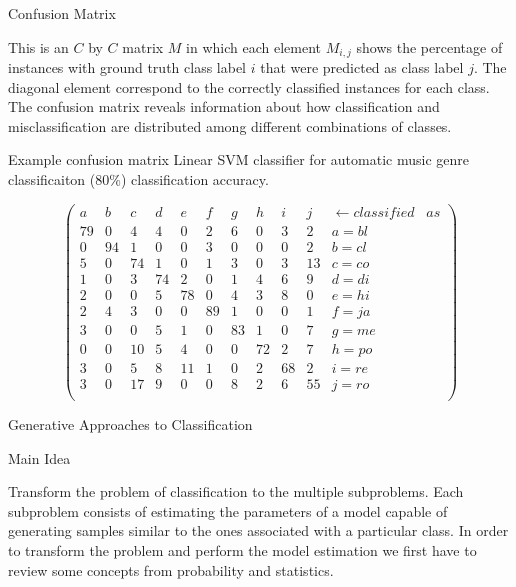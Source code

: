 \documentclass[12pt]{beamer}
\begin{document}
\begin{frame}
\begin{block}{Confusion Matrix} 

This is an $C$ by $C$ matrix $M$ in which each element $M_{i,j}$ shows
the percentage of instances with ground truth class label $i$ that
were predicted as class label $j$. The diagonal element correspond to
the correctly classified instances for each class. The confusion
matrix reveals information about how classification and
misclassification are distributed among different combinations of
classes.
\end{block} 
\end{frame}

\begin{frame}{Example confusion matrix} 
Linear SVM classifier for automatic music genre classificaiton 
($80 \% $) classification accuracy. 

\[
\left( 
\begin{array}{cccccccccc|c}
a  & b	& c & d	& e & f	& g & h	& i & j	& \leftarrow classified \;\;\; as \\ 
79 & 0	& 4  & 4  & 0  & 2 & 6 & 0 & 3 &  2   & a = bl \\ 
0  & 94	& 1  & 0  & 0  & 3 & 0 & 0 & 0 &  2   & b = cl \\ 
5  & 0  & 74 & 1  & 0  & 1 & 3 & 0 & 3 & 13  & c = co \\ 
1  & 0 	& 3  & 74 & 2  & 0 & 1 & 4 & 6 &  9  & d = di \\ 
2  & 0	& 0  & 5  & 78 & 0 & 4 & 3 & 8 &  0  &  e = hi \\ 
2  & 4	& 3  & 0  & 0  & 89 & 1 & 0 & 0	& 1  & f = ja \\ 
3  & 0	& 0  & 5  & 1  & 0  & 83 & 1 & 0 & 7 & g = me \\ 
0  & 0	& 10  &	5 & 4  & 0  &  0 & 72 & 2 & 7	& h = po \\ 
3  & 0	& 5  & 	8 & 11 & 1  &  0 & 2  & 68 & 2	& i = re \\ 
3  & 0	& 17 &	9 & 0  & 0  &  8 & 2 &	6  & 55	& j = ro \\ 
\end{array}
\right)
\]
\end{frame} 




\begin{frame}{Generative Approaches to Classification} 

\begin{block}{Main Idea}

Transform the problem of classification to the multiple
subproblems. Each subproblem consists of estimating the parameters of
a model capable of generating samples similar to the ones associated
with a particular class. In order to transform the problem and perform
the model estimation we first have to review some concepts from
probability and statistics.

\end{block} 
\end{frame}
\end{document}
